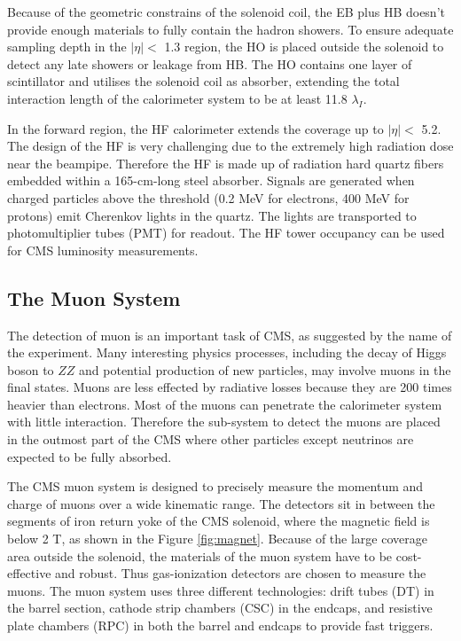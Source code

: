 \documentclass[thesis.tex]{subfiles}
\begin{document}
Because of the geometric constrains of the solenoid coil, the EB plus HB doesn't provide enough materials to fully contain the hadron showers. 
To ensure adequate sampling depth in the $|\eta| < $ 1.3 region, the HO is placed outside the solenoid to detect any late showers or leakage from HB. 
The HO contains one layer of scintillator and utilises the solenoid coil as absorber, extending the total interaction length of the calorimeter system to be at least 11.8 $\lambda_I$. 

In the forward region, the HF calorimeter extends the coverage up to $|\eta| < $ 5.2.
The design of the HF is very challenging due to the extremely high radiation dose near the beampipe.  
Therefore the HF is made up of radiation hard quartz fibers embedded within a 165-cm-long steel absorber.  
Signals are generated when charged particles above the threshold (0.2 MeV for electrons, 400 MeV for protons) emit Cherenkov lights in the quartz.
The lights are transported to photomultiplier tubes (PMT) for readout. 
The HF tower occupancy can be used for CMS luminosity measurements. 

\subsection{The Muon System}
The detection of muon is an important task of CMS, as suggested by the name of the experiment. 
Many interesting physics processes, including the decay of Higgs boson to $ZZ$ and potential production of new particles, may involve muons in the final states.
Muons are less effected by radiative losses because they are 200 times heavier than electrons.
Most of the muons can penetrate the calorimeter system with little interaction. 
Therefore the sub-system to detect the muons are placed in the outmost part of the CMS where other particles except neutrinos are expected to be fully absorbed.

The CMS muon system is designed to precisely measure the momentum and charge of muons over a wide kinematic range.
The detectors sit in between the segments of iron return yoke of the CMS solenoid, where the magnetic field is below 2 T, as shown in the Figure \ref{fig:magnet}.
Because of the large coverage area outside the solenoid, the materials of the muon system have to be cost-effective and robust.
Thus gas-ionization detectors are chosen to measure the muons. 
The muon system uses three different technologies: drift tubes (DT) in the barrel section, cathode strip chambers (CSC) in the endcaps, and resistive plate chambers (RPC) in both the barrel and endcaps to provide fast triggers. \\
\end{document}
